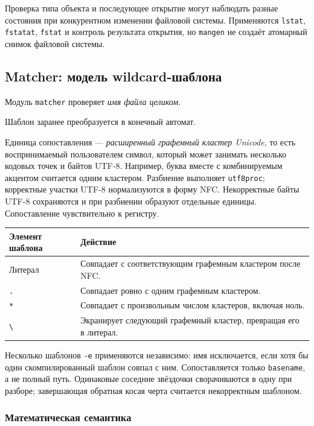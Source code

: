 \documentclass[12pt,a4paper]{article}
\begin{document}
Проверка типа объекта и последующее открытие могут наблюдать разные состояния
при конкурентном изменении файловой системы. Применяются \texttt{lstat},
\texttt{fstatat}, \texttt{fstat} и контроль результата открытия, но
\texttt{mangen} не создаёт атомарный снимок файловой системы.

\subsection{Matcher: модель wildcard-шаблона}

Модуль \texttt{matcher} проверяет \emph{имя файла целиком}.

Шаблон заранее преобразуется в конечный автомат.

Единица сопоставления --- \emph{расширенный
графемный кластер Unicode}, то есть воспринимаемый пользователем символ,
который может занимать несколько кодовых точек и байтов UTF-8. Например,
буква вместе с комбинируемым акцентом считается одним кластером.
Разбиение выполняет \texttt{utf8proc}; корректные участки UTF-8
нормализуются в форму NFC. Некорректные байты UTF-8 сохраняются и при
разбиении образуют отдельные единицы. Сопоставление чувствительно к регистру.

\begin{longtable}{P{0.21\textwidth}P{0.70\textwidth}}
\toprule
Элемент шаблона & Действие \\
\midrule
\endhead
Литерал & Совпадает с соответствующим графемным кластером после NFC. \\
\texttt{.} & Совпадает ровно с одним графемным кластером. \\
\texttt{*} & Совпадает с произвольным числом кластеров, включая ноль. \\
\texttt{\textbackslash} & Экранирует следующий графемный кластер, превращая его в литерал. \\
\bottomrule
\end{longtable}

Несколько шаблонов \texttt{-e} применяются независимо: имя исключается,
если хотя бы один скомпилированный шаблон совпал с ним. Сопоставляется
только \texttt{basename}, а не полный путь. Одинаковые соседние звёздочки
сворачиваются в одну при разборе; завершающая обратная косая черта
считается некорректным шаблоном.

\subsubsection{Математическая семантика}
\end{document}
